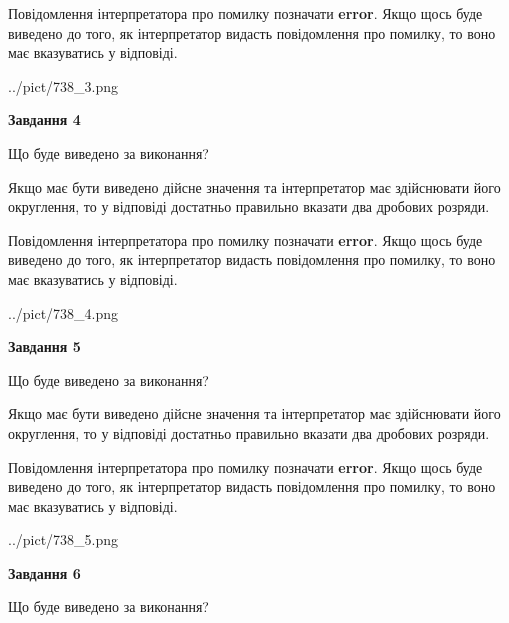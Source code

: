 \documentclass[12pt, ukrainian]{article}
\begin{document}
{\begin {Large}
Повідомлення інтерпретатора про помилку позначати \textbf{error}.
Якщо щось буде виведено до того, як інтерпретатор видасть повідомлення про помилку, 
то воно має вказуватись у відповіді. \par

\begin{center}
	{../pict/738_3.png}
\end{center}
\newpage

{\begin {center}\textbf{Завдання 4}\end {center}}\par
Що буде виведено за виконання? \par

Якщо має бути виведено дійсне значення та інтерпретатор має здійснювати його округлення, 
то у відповіді достатньо правильно вказати два дробових розряди.

Повідомлення інтерпретатора про помилку позначати \textbf{error}.
Якщо щось буде виведено до того, як інтерпретатор видасть повідомлення про помилку, 
то воно має вказуватись у відповіді. \par

\begin{center}
	{../pict/738_4.png}
\end{center}
\newpage

{\begin {center}\textbf{Завдання 5}\end {center}}\par
Що буде виведено за виконання? \par

Якщо має бути виведено дійсне значення та інтерпретатор має здійснювати його округлення, 
то у відповіді достатньо правильно вказати два дробових розряди.

Повідомлення інтерпретатора про помилку позначати \textbf{error}.
Якщо щось буде виведено до того, як інтерпретатор видасть повідомлення про помилку, 
то воно має вказуватись у відповіді. \par

\begin{center}
	{../pict/738_5.png}
\end{center}
\newpage

{\begin {center}\textbf{Завдання 6}\end {center}}\par
Що буде виведено за виконання? \par


\end{Large}}
\end{document}
